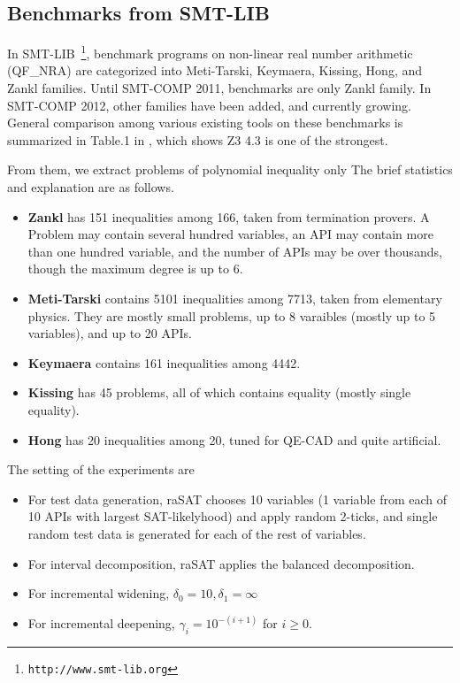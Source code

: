 \documentclass[runningheads,a4paper,oribibl]{llncs}
\begin{document}
\subsection{Benchmarks from SMT-LIB} \label{sec:expsmtlib}

In SMT-LIB~\footnote{\tt http://www.smt-lib.org}, 
benchmark programs on non-linear real number arithmetic 
(QF\_NRA) are categorized into Meti-Tarski, Keymaera, Kissing, Hong, and Zankl families. 
Until SMT-COMP 2011, benchmarks are only Zankl family. 
In SMT-COMP 2012, other families have been added, and currently growing. 
General comparison among various existing tools on these benchmarks is summarized in 
Table.1 in \cite{Jovanovic13}, which shows Z3 4.3 is one of the strongest. 

From them, we extract problems of polynomial inequality only %
The brief statistics and explanation are as follows. 
\begin{itemize}
\item {\bf Zankl} has 151 inequalities among 166, taken from termination provers. 
A Problem may contain several hundred variables, an API may contain more than one hundred variable, 
and the number of APIs may be over thousands, though the maximum degree is up to $6$. 
\item {\bf Meti-Tarski} contains 5101 inequalities among 7713, taken from elementary physics.
They are mostly small problems, up to 8 varaibles (mostly up to 5 variables), and up to 20 APIs. 
\item {\bf Keymaera} contains 161 inequalities among 4442. 
\item {\bf Kissing} has 45 problems, all of which contains equality (mostly single equality). 
\item {\bf Hong} has 20 inequalities among 20, tuned for QE-CAD and quite artificial. 
\end{itemize}


The setting of the experiments are
\begin{itemize}
\item For test data generation, raSAT chooses 10 variables (1 variable from each of 10 APIs with largest SAT-likelyhood) and apply random 2-ticks, and single random test data is generated for each of the rest of variables.
\item For interval decomposition, raSAT applies the balanced decomposition.
\item For incremental widening, $\delta_0 = 10, \delta_1 = \infty$
\item For incremental deepening, $\gamma_i = 10^{-(i+1)}$ for $i \ge 0$.
\end{itemize}
\end{document}
